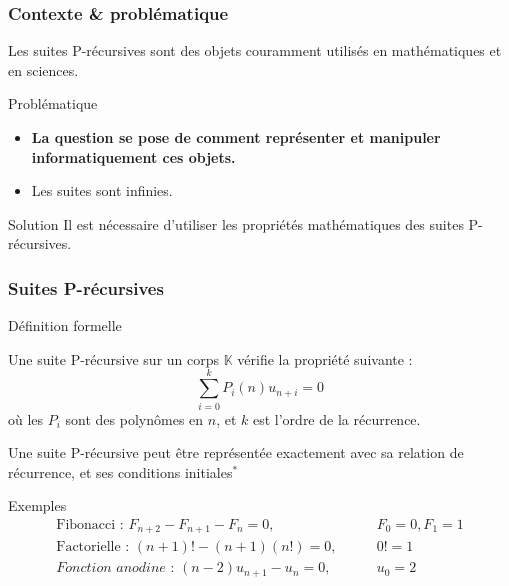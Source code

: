 \documentclass{beamer}
\begin{document}
\begin{frame}
\frametitle{Contexte \& problématique}
\begin{center}
Les suites P-récursives sont des objets couramment utilisés en mathématiques et en sciences.
\begin{alertblock}{Problématique}
    \begin{itemize}
        \item \textbf{\large La question se pose de comment représenter et manipuler
                informatiquement ces objets.}
        \item Les suites sont infinies.
    \end{itemize}
\end{alertblock}
\pause
\begin{exampleblock}{Solution}
    Il est nécessaire d'utiliser les propriétés mathématiques des suites P-récursives.
\end{exampleblock}
\end{center}
\end{frame}
        

\begin{frame}
\frametitle{Suites P-récursives}
\begin{center}
    \vspace{-2ex}
\begin{block}{Définition formelle} \begin{center}
    Une suite P-récursive sur un corps $\mathbb K$ vérifie la propriété suivante :
    \begin{equation*}
        \sum^k_{i=0} P_i(n)u_{n+i} = 0
    \end{equation*}
    où les $P_i$ sont des polynômes en $n$, et $k$ est l'ordre de la récurrence.
\end{center} \end{block}
Une suite P-récursive peut être représentée exactement avec sa relation de récurrence,
et ses conditions initiales$^*$
\begin{exampleblock}{Exemples}
    \vspace{-2ex}
    \begin{eqnarray*}
        \text{Fibonacci : } F_{n+2} - F_{n+1} - F_n = 0,  \qquad &F_0 = 0, F_1 = 1 \\
        \text{Factorielle : } (n+1)! - (n+1)(n!) = 0,  \qquad &0! = 1 \\
        \textit{Fonction anodine : } (n-2)u_{n+1} - u_n = 0,  \qquad &u_0 = 2\\
    \end{eqnarray*}
    \vspace{-7ex}
\end{exampleblock}
\end{center}
\end{frame}
\end{document}
